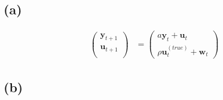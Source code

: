 \documentclass[fleqn, letterpaper]{tufte-handout}
\begin{document}
{\scriptsize
        \begin{minipage}{\linewidth}
                
        \end{minipage}
}

\subsection{(a)}
\begin{align*}
\begin{pmatrix}
\mathbf{y}_{t+1} \\
\mathbf{u}_{t+1} \\
\end{pmatrix}
&=
\begin{pmatrix}
a\mathbf{y}_t + \mathbf{u}_t \\
\rho\mathbf{u}^{(true)}_t+ \mathbf{w}_t
\end{pmatrix}
\end{align*}

\subsection{(b)}
\end{document}
